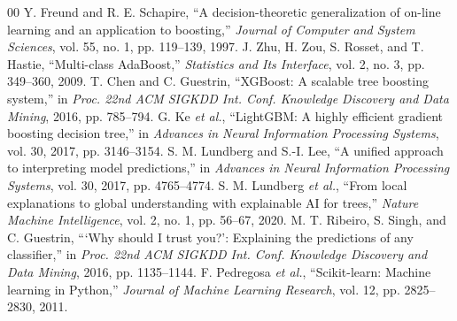 \documentclass[conference]{IEEEtran}
\begin{document}
\begin{thebibliography}{00}
 Y. Freund and R. E. Schapire, ``A decision-theoretic generalization of on-line learning and an application to boosting,'' \textit{Journal of Computer and System Sciences}, vol. 55, no. 1, pp. 119--139, 1997.
 J. Zhu, H. Zou, S. Rosset, and T. Hastie, ``Multi-class AdaBoost,'' \textit{Statistics and Its Interface}, vol. 2, no. 3, pp. 349--360, 2009.
 T. Chen and C. Guestrin, ``XGBoost: A scalable tree boosting system,'' in \textit{Proc. 22nd ACM SIGKDD Int. Conf. Knowledge Discovery and Data Mining}, 2016, pp. 785--794.
 G. Ke \textit{et al.}, ``LightGBM: A highly efficient gradient boosting decision tree,'' in \textit{Advances in Neural Information Processing Systems}, vol. 30, 2017, pp. 3146--3154.
 S. M. Lundberg and S.-I. Lee, ``A unified approach to interpreting model predictions,'' in \textit{Advances in Neural Information Processing Systems}, vol. 30, 2017, pp. 4765--4774.
 S. M. Lundberg \textit{et al.}, ``From local explanations to global understanding with explainable AI for trees,'' \textit{Nature Machine Intelligence}, vol. 2, no. 1, pp. 56--67, 2020.
 M. T. Ribeiro, S. Singh, and C. Guestrin, ```Why should I trust you?': Explaining the predictions of any classifier,'' in \textit{Proc. 22nd ACM SIGKDD Int. Conf. Knowledge Discovery and Data Mining}, 2016, pp. 1135--1144.
 F. Pedregosa \textit{et al.}, ``Scikit-learn: Machine learning in Python,'' \textit{Journal of Machine Learning Research}, vol. 12, pp. 2825--2830, 2011.
\end{thebibliography}
\end{document}
